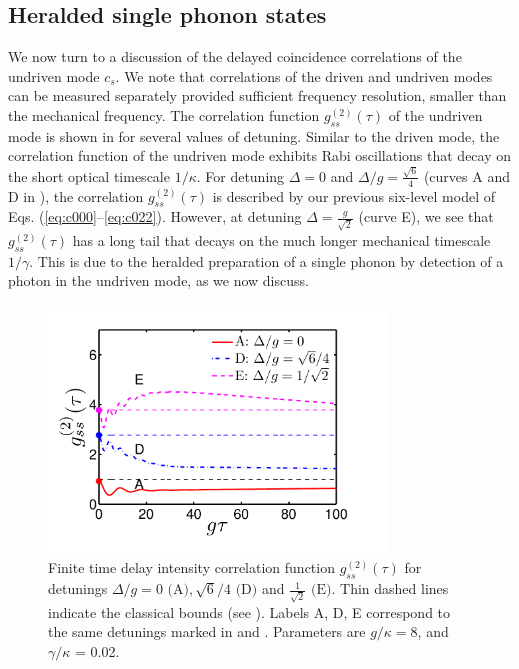 \subsection{Heralded single phonon states}

We now turn to a discussion of the delayed coincidence
correlations of the undriven mode $c_s$.
We note that correlations of the driven
and undriven modes can be measured separately
provided sufficient frequency resolution, smaller than
  the mechanical frequency.
The correlation function
$g^{(2)}_{ss}(\tau)$
of the undriven mode
is shown in  for several
values of detuning.
Similar to the driven mode, the
correlation function of the undriven mode
exhibits Rabi oscillations 
that decay on the short optical
timescale
$1/\kappa$.
For detuning $\Delta = 0$ and 
$\Delta/g = \frac{\sqrt{6}}{4}$
(curves A and D in ),
the correlation $g^{(2)}_{ss}(\tau)$
is described by
our previous six-level 
model of Eqs. (\ref{eq:c000}--\ref{eq:c022}).
However,  at detuning $\Delta = \frac{g}{\sqrt{2}}$
(curve E), we see that
$g^{(2)}_{ss}(\tau)$ has a long
tail that decays
on the much longer mechanical timescale $1/\gamma$.
This is due to the heralded preparation
of a single phonon by detection of a photon in the
undriven mode, as we now discuss.
\begin{figure}[htb] \centering
  \includegraphics[width=0.8\textwidth]{./figs_Komar2013/fig6.pdf}
  \caption{
  \label{fig:g2sstau}
  Finite time delay intensity correlation function $g^{(2)}_{ss}(\tau)$
  for detunings $\Delta/g = 0 \text{ (A)}, \sqrt{6}/4 \text{ (D)}$
  and
  $\frac{1}{\sqrt{2}} \text{ (E)}$.
  Thin dashed lines indicate the classical bounds
  (see  ).
  Labels A, D, E correspond to the same detunings
  marked in 
  and
  .
  Parameters are $g/\kappa = 8$, and $\gamma/\kappa$ = 0.02.
  }
\end{figure}



